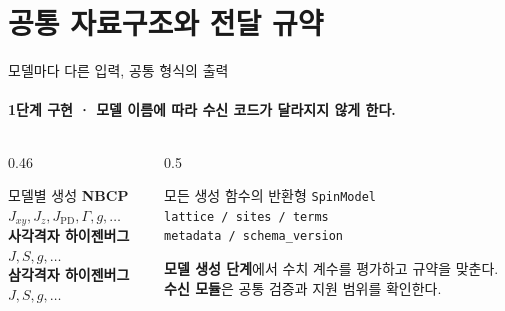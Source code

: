 \section[공통 자료구조와 전달 규약]{공통 자료구조와 전달 규약}

\begin{frame}[plain,label=section-contract]
  \sectionpage
\end{frame}

\begin{frame}[label=common-interface]{모델마다 다른 입력, 공통 형식의 출력}
  \framesubtitle{1단계 구현 · 모델 이름에 따라 수신 코드가 달라지지 않게 한다.}
  \begin{columns}[T,onlytextwidth]
    \begin{column}{0.46\textwidth}
      \begin{block}{모델별 생성}
        \textbf{NBCP}\\
        $J_{xy},J_z,J_{\mathrm{PD}},\Gamma,g,\ldots$\\[0.7em]
        \textbf{사각격자 하이젠버그}\\
        $J,S,g,\ldots$\\[0.7em]
        \textbf{삼각격자 하이젠버그}\\
        $J,S,g,\ldots$
      \end{block}
    \end{column}
    \begin{column}{0.5\textwidth}
      \begin{block}{모든 생성 함수의 반환형}
        \texttt{SpinModel}\\[0.6em]
        \texttt{lattice / sites / terms}\\
        \texttt{metadata / schema\_version}
      \end{block}
      \medskip
      \textbf{모델 생성 단계}에서 수치 계수를 평가하고 규약을 맞춘다.\\[0.5em]
      \textbf{수신 모듈}은 공통 검증과 지원 범위를 확인한다.
    \end{column}
  \end{columns}
  \medskip
\end{frame}

